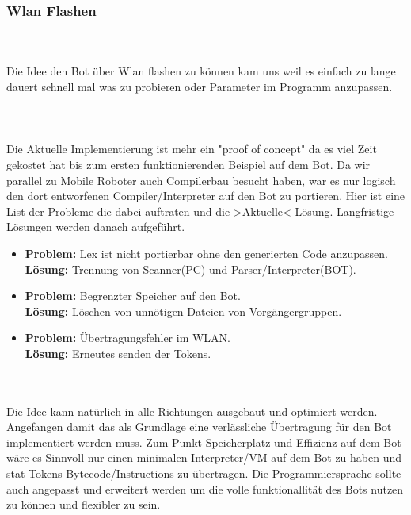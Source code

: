 \subsubsection{Wlan Flashen}
\label{wlan-flash}

\\
\\
Die Idee den Bot über Wlan flashen  zu können kam uns weil es einfach zu lange dauert schnell mal was zu probieren oder Parameter im Programm anzupassen.
\\
\\
\\
\\
Die Aktuelle Implementierung ist mehr ein "proof of concept" da es viel Zeit gekostet hat bis zum ersten funktionierenden Beispiel auf dem Bot. 
Da wir parallel zu Mobile Roboter auch Compilerbau besucht haben, war es nur logisch den dort entworfenen Compiler/Interpreter auf den Bot zu portieren.
Hier ist eine List der Probleme die dabei auftraten und die >Aktuelle< Lösung.
Langfristige Lösungen werden danach aufgeführt.
\\
\begin{itemize}
	\item 	\textbf{Problem:} Lex ist nicht portierbar ohne den generierten Code anzupassen. \\
		\textbf{Lösung:} Trennung von Scanner(PC) und Parser/Interpreter(BOT).

	\item 	\textbf{Problem:} Begrenzter Speicher auf den Bot. \\
		\textbf{Lösung:} Löschen von unnötigen Dateien von Vorgängergruppen.
	
	\item 	\textbf{Problem:} Übertragungsfehler im WLAN. \\
		\textbf{Lösung:} Erneutes senden der Tokens.
\end{itemize}


\\
\\
Die Idee kann natürlich in alle Richtungen ausgebaut und optimiert werden.
Angefangen damit das als Grundlage eine verlässliche Übertragung für den Bot implementiert werden muss.
Zum Punkt Speicherplatz und Effizienz auf dem Bot wäre es Sinnvoll nur einen minimalen Interpreter/VM
 auf dem Bot zu haben und stat Tokens Bytecode/Instructions zu übertragen.
  Die Programmiersprache sollte auch angepasst und erweitert werden um die volle funktionallität des Bots nutzen zu können und flexibler zu sein.
